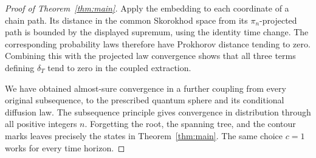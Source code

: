\begin{proof}[Proof of Theorem~\ref{thm:main}]
Apply the embedding to each coordinate of a chain path.  Its
distance in the common Skorokhod space from its $\pi_n$-projected
path is bounded by the displayed supremum, using the identity time
change.  The corresponding probability laws therefore have
Prokhorov distance tending to zero.  Combining this with the
projected law convergence shows that all three terms defining
$\delta_T$ tend to zero in the coupled extraction.

We have obtained almost-sure convergence in a further coupling from
every original subsequence, to the prescribed quantum sphere and
its conditional diffusion law.  The subsequence principle gives
convergence in distribution through all positive integers $n$.
Forgetting the root, the spanning tree, and the contour marks
leaves precisely the states in Theorem~\ref{thm:main}.  The same
choice $c=1$ works for every time horizon.
\end{proof}

